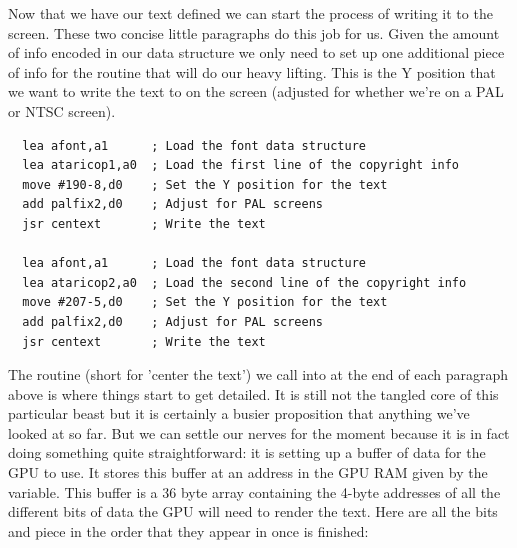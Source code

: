 Now that we have our text defined we can start the process of writing it to the screen. These two concise little paragraphs
do this job for us. Given the amount of info encoded in our  data structure we only need to set up one additional
piece of info for the  routine that will do our heavy lifting. This is the Y position that we want to write
the text to on the screen (adjusted for whether we're on a PAL or NTSC screen).

\begin{lstlisting}
  lea afont,a1      ; Load the font data structure
  lea ataricop1,a0  ; Load the first line of the copyright info
  move #190-8,d0    ; Set the Y position for the text
  add palfix2,d0    ; Adjust for PAL screens 
  jsr centext       ; Write the text                 

  lea afont,a1      ; Load the font data structure
  lea ataricop2,a0  ; Load the second line of the copyright info
  move #207-5,d0    ; Set the Y position for the text
  add palfix2,d0    ; Adjust for PAL screens 
  jsr centext       ; Write the text                 
\end{lstlisting}

The  routine (short for 'center the text')  we call into at the end of each paragraph above is where things start to get detailed. It is still
not the tangled core of this particular beast but it is certainly a busier proposition that anything we've looked at so far.
But we can settle our nerves for the moment because it is in fact doing something quite straightforward:
it is setting up a buffer of data for the GPU to use. It stores this buffer at an address in the GPU RAM given by the  variable. This buffer
is a 36 byte array containing the 4-byte addresses of all the different bits of data the GPU will need to render the text. Here
are all the bits and piece in the order that they appear in  once  is finished:

